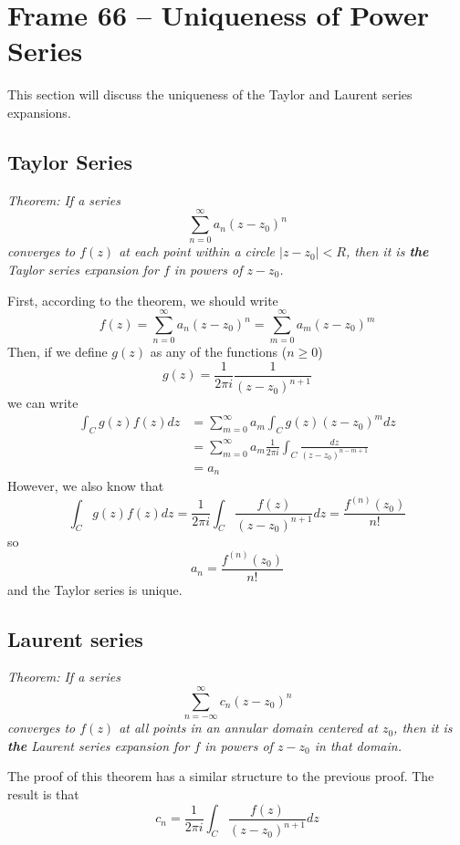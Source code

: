 \documentclass{article}
\renewcommand{\emph}{\textbf}
\begin{document}
\clearpage
\section{Frame 66 -- Uniqueness of Power Series}
This section will discuss the uniqueness of the Taylor and Laurent series expansions.

\subsection{Taylor Series}
\textit{Theorem: If a series
\[
	\sum_{n=0}^\infty a_n (z - z_0)^n 
\]
converges to $f(z)$ at each point within a circle $|z - z_0| < R$, then it is \emph{the} Taylor series expansion for $f$ in powers of $z - z_0$.}

First, according to the theorem, we should write
\[
	f(z) = \sum_{n=0}^\infty a_n(z - z_0)^n = \sum_{m=0}^\infty a_m(z - z_0)^m
\]
Then, if we define $g(z)$ as any of the functions ($n \ge 0$)
\[
	g(z) = \frac{1}{2\pi i} \frac{1}{(z - z_0)^{n+1}}
\]
we can write
\begin{align*}
	\int_C g(z) f(z) dz 
	&= \sum_{m=0}^\infty a_m \int_C g(z) (z - z_0)^m dz \\
	&= \sum_{m=0}^\infty a_m \frac{1}{2\pi i} \int_C \frac{dz}{(z - z_0)^{n-m+1}} \\
	&= a_n
\end{align*}
However, we also know that
\[
	\int_C g(z) f(z) dz
	= \frac{1}{2\pi i} \int_C \frac{f(z)}{(z - z_0)^{n+1}} dz
	= \frac{f^{(n)}(z_0)}{n!}
\]
so
\[
	a_n = \frac{f^{(n)}(z_0)}{n!}
\]
and the Taylor series is unique.

\subsection{Laurent series}
\textit{Theorem: If a series
\[
	\sum_{n=-\infty}^\infty c_n (z - z_0)^n
\]
converges to $f(z)$ at all points in an annular domain centered at $z_0$, then it is \emph{the} Laurent series expansion for $f$ in powers of $z - z_0$ in that domain.}

The proof of this theorem has a similar structure to the previous proof. The result is that
\[
	c_n = \frac{1}{2\pi i} \int_C \frac{f(z)}{(z - z_0)^{n+1}} dz
\]
\end{document}
